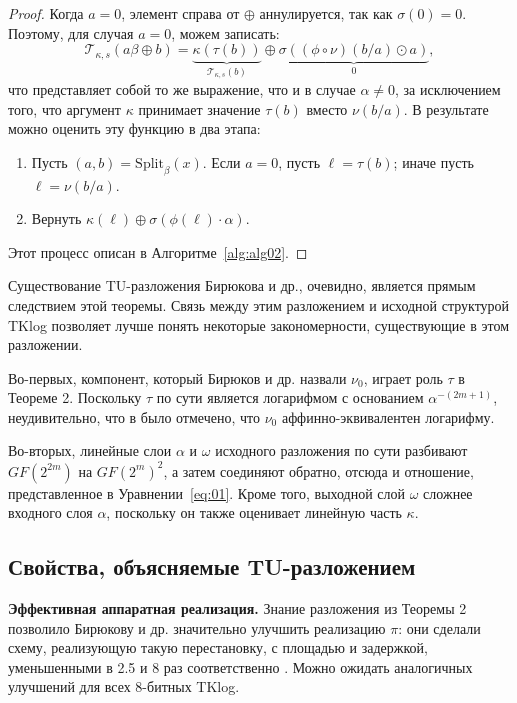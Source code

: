 \begin{proof}
Когда \(a = 0\), элемент справа от \(\oplus\) аннулируется, так как \(\sigma(0) = 0\). Поэтому, для случая \(a = 0\), можем записать:
\[
  \mathscr{T}_{\kappa, s}(a \beta \oplus b)=\underbrace{\kappa(\tau(b))}_{\mathscr{T}_{\kappa, s}(b)} \oplus \underbrace{\sigma((\phi \circ \nu)(b / a) \odot a)}_0,
\]
что представляет собой то же выражение, что и в случае \(\alpha \neq 0\), за исключением того, что аргумент \(\kappa\) принимает значение \(\tau(b)\) вместо \(\nu(b/a)\). В результате можно оценить эту функцию в два этапа:

\begin{enumerate}
  \item Пусть \((a, b) = \mathrm{Split}_{\beta}(x)\). Если \(a = 0\), пусть \(\ell = \tau(b)\); иначе пусть \(\ell = \nu(b/a)\).
  \item Вернуть \(\kappa(\ell) \oplus \sigma(\phi(\ell) \cdot \alpha)\).
\end{enumerate}

Этот процесс описан в Алгоритме~\ref{alg:alg02}.
\end{proof}

Существование TU-разложения Бирюкова и др., очевидно, является прямым следствием этой теоремы. Связь между этим разложением и исходной структурой TKlog позволяет лучше понять некоторые закономерности, существующие в этом разложении.

Во-первых, компонент, который Бирюков и др. назвали \(\nu_0\), играет роль \(\tau\) в Теореме 2. Поскольку \(\tau\) по сути является логарифмом с основанием \(\alpha^{-(2m+1)}\), неудивительно, что в \cite{PU16} было отмечено, что \(\nu_0\) аффинно-эквивалентен логарифму.

Во-вторых, линейные слои \(\alpha\) и \(\omega\) исходного разложения по сути разбивают \(GF(2^{2m})\) на \(GF(2^m)^2\), а затем соединяют обратно, отсюда и отношение, представленное в Уравнении~\ref{eq:01}. Кроме того, выходной слой \(\omega\) сложнее входного слоя \(\alpha\), поскольку он также оценивает линейную часть \(\kappa\).

\subsection{Свойства, объясняемые TU-разложением}

\textbf{Эффективная аппаратная реализация.} Знание разложения из Теоремы 2 позволило Бирюкову и др. значительно улучшить реализацию \(\pi\): они сделали схему, реализующую такую перестановку, с площадью и задержкой, уменьшенными в 2.5 и 8 раз соответственно \cite{BPU16b}. Можно ожидать аналогичных улучшений для всех 8-битных TKlog.

